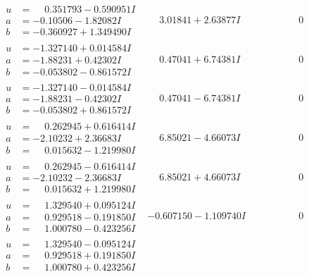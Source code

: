 \documentclass[1p]{elsarticle_modified}
\theoremstyle{definition}
\begin{document}
$$\begin{array}{c|c|c}
\begin{aligned}
u &= \phantom{-}0.351793 - 0.590951 I \\
a &= -0.10506 - 1.82082 I \\
b &= -0.360927 + 1.349490 I\end{aligned}
 & \phantom{-}3.01841 + 2.63877 I & \phantom{-0.000000 } 0 \\ \hline\begin{aligned}
u &= -1.327140 + 0.014584 I \\
a &= -1.88231 + 0.42302 I \\
b &= -0.053802 - 0.861572 I\end{aligned}
 & \phantom{-}0.47041 + 6.74381 I & \phantom{-0.000000 } 0 \\ \hline\begin{aligned}
u &= -1.327140 - 0.014584 I \\
a &= -1.88231 - 0.42302 I \\
b &= -0.053802 + 0.861572 I\end{aligned}
 & \phantom{-}0.47041 - 6.74381 I & \phantom{-0.000000 } 0 \\ \hline\begin{aligned}
u &= \phantom{-}0.262945 + 0.616414 I \\
a &= -2.10232 + 2.36683 I \\
b &= \phantom{-}0.015632 - 1.219980 I\end{aligned}
 & \phantom{-}6.85021 - 4.66073 I & \phantom{-0.000000 } 0 \\ \hline\begin{aligned}
u &= \phantom{-}0.262945 - 0.616414 I \\
a &= -2.10232 - 2.36683 I \\
b &= \phantom{-}0.015632 + 1.219980 I\end{aligned}
 & \phantom{-}6.85021 + 4.66073 I & \phantom{-0.000000 } 0 \\ \hline\begin{aligned}
u &= \phantom{-}1.329540 + 0.095124 I \\
a &= \phantom{-}0.929518 - 0.191850 I \\
b &= \phantom{-}1.000780 - 0.423256 I\end{aligned}
 & -0.607150 - 1.109740 I & \phantom{-0.000000 } 0 \\ \hline\begin{aligned}
u &= \phantom{-}1.329540 - 0.095124 I \\
a &= \phantom{-}0.929518 + 0.191850 I \\
b &= \phantom{-}1.000780 + 0.423256 I\end{aligned}

\end{array}$$
\end{document}
